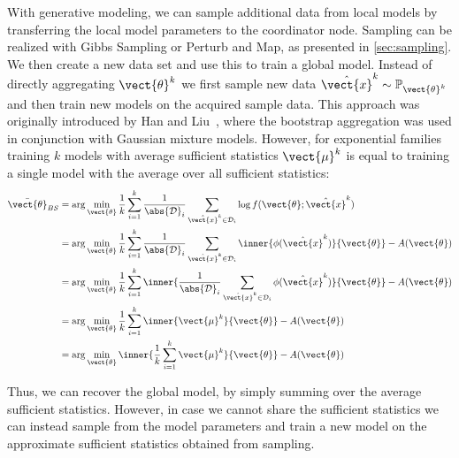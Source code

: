 With generative modeling, we can sample additional data from local models by transferring the local model parameters to the coordinator node.
Sampling can be realized with Gibbs Sampling or Perturb and Map, as presented in \autoref{sec:sampling}.
We then create a new data set and use this to train a  global model. 
Instead of directly aggregating $\vect{\theta}^k$ we first sample new data  $\hat{\vect{x}}^k \sim \mathbb{P}_{\vect{\theta}^k}$ and then train new models on the acquired sample data.
This approach was originally introduced by Han and Liu~\cite{han2016bootstrap}, where the bootstrap aggregation was used in conjunction with Gaussian mixture models.
However, for exponential families training $k$ models with average sufficient statistics $\vect{\mu}^k$ is equal to training a single model with the average over all sufficient statistics:
\begin{equation}
    \begin{split}
        \bar{\vect{\theta}}_{BS} &= \arg\min_{\vect{\theta}} \frac{1}{k}\sum_{i=1}^k \frac{1}{\abs{\mathcal{D}}_i} \sum_{\hat{\vect{x}}^k \in \mathcal{D}_i} \log f(\vect{\theta}; \hat{\vect{x}}^k) \\
        &=  \arg\min_{\vect{\theta}} \frac{1}{k}\sum_{i=1}^k \frac{1}{\abs{\mathcal{D}}_i} \sum_{\hat{\vect{x}}^k \in \mathcal{D}_i} \inner{\phi(\hat{\vect{x}}^k)}{\vect{\theta}} - A(\vect{\theta}) \\
        &= \arg\min_{\vect{\theta}} \frac{1}{k}\sum_{i=1}^k \inner{\frac{1}{\abs{\mathcal{D}}_i} \sum_{\hat{\vect{x}}^k \in \mathcal{D}_i} \phi(\hat{\vect{x}}^k)}{\vect{\theta}} - A(\vect{\theta}) \\
        &= \arg\min_{\vect{\theta}} \frac{1}{k}\sum_{i=1}^k \inner{\vect{\mu}^k}{\vect{\theta}} - A(\vect{\theta}) \\
        & =  \arg\min_{\vect{\theta}} \inner{\frac{1}{k}\sum_{i=1}^k  \vect{\mu}^k}{\vect{\theta}} - A(\vect{\theta})
    \end{split}
\end{equation}

Thus, we can recover the global model, by simply summing over the average sufficient statistics.
However, in case we cannot share the sufficient statistics we can instead sample from the model parameters and train a new model on the approximate sufficient statistics obtained from sampling.


